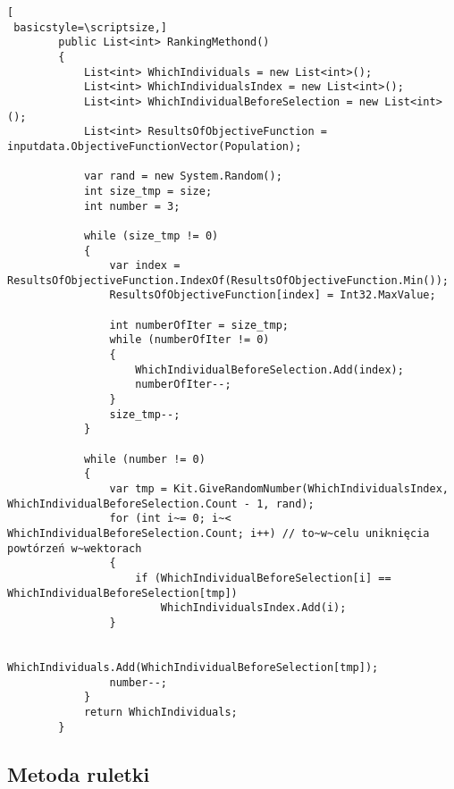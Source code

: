 \begin{lstlisting}[
 basicstyle=\scriptsize,]
        public List<int> RankingMethond()
        {
            List<int> WhichIndividuals = new List<int>();
            List<int> WhichIndividualsIndex = new List<int>();
            List<int> WhichIndividualBeforeSelection = new List<int>();
            List<int> ResultsOfObjectiveFunction = inputdata.ObjectiveFunctionVector(Population);

            var rand = new System.Random();
            int size_tmp = size;
            int number = 3;

            while (size_tmp != 0)
            {
                var index = ResultsOfObjectiveFunction.IndexOf(ResultsOfObjectiveFunction.Min());
                ResultsOfObjectiveFunction[index] = Int32.MaxValue;

                int numberOfIter = size_tmp;
                while (numberOfIter != 0)
                {
                    WhichIndividualBeforeSelection.Add(index);
                    numberOfIter--;
                }
                size_tmp--;
            }

            while (number != 0)
            {
                var tmp = Kit.GiveRandomNumber(WhichIndividualsIndex, WhichIndividualBeforeSelection.Count - 1, rand);
                for (int i~= 0; i~< WhichIndividualBeforeSelection.Count; i++) // to~w~celu uniknięcia powtórzeń w~wektorach
                {
                    if (WhichIndividualBeforeSelection[i] == WhichIndividualBeforeSelection[tmp])
                        WhichIndividualsIndex.Add(i);
                }

                WhichIndividuals.Add(WhichIndividualBeforeSelection[tmp]);
                number--;
            }
            return WhichIndividuals;
        }
\end{lstlisting}

\subsection*{Metoda ruletki}

